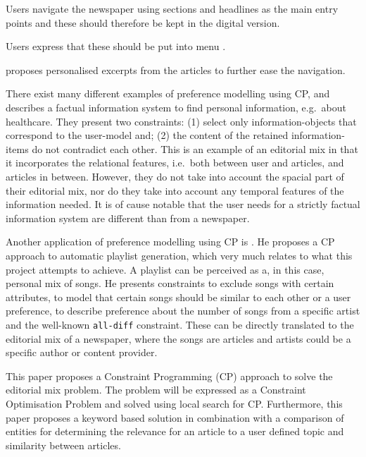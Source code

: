 Users navigate the newspaper using sections and headlines as the main entry points \cite{FULLTEXT01.pdf} and these should therefore be kept in the digital version.

Users express that these should be put into menu \cite{kristin_fredrik.pdf}.

\cite{fulltext.pdf} proposes personalised excerpts from the articles to further ease the navigation.

There exist many different examples of preference modelling using CP, and \cite{Constraint-Satisfaction-Methods-for-Information-Personalization.pdf} describes a factual information system to find personal information, e.g.\ about healthcare. They present two constraints: (1) select only information-objects that correspond to the user-model and; (2) the content of the retained information-items do not contradict each other. This is an example of an editorial mix in that it incorporates the relational features, i.e.\ both between user and articles, and articles in between. However, they do not take into account the spacial part of their editorial mix, nor do they take into account any temporal features of the information needed. It is of cause notable that the user needs for a strictly factual information system are different than from a newspaper.

Another application of preference modelling using CP is \cite{LSVossen}. He proposes a CP approach to automatic playlist generation, which very much relates to what this project attempts to achieve. A playlist can be perceived as a, in this case, personal mix of songs. He presents constraints to exclude songs with certain attributes, to model that certain songs should be similar to each other or a user preference, to describe preference about the number of songs from a specific artist and the well-known \texttt{all-diff} constraint. These can be directly translated to the editorial mix of a newspaper, where the songs are articles and artists could be a specific author or content provider.



This paper proposes a Constraint Programming (CP) approach to solve the editorial mix problem. The problem will be expressed as a Constraint Optimisation Problem and solved using local search for CP. Furthermore, this paper proposes a keyword based solution in combination with a comparison of entities for determining the relevance for an article to a user defined topic and similarity between articles.

